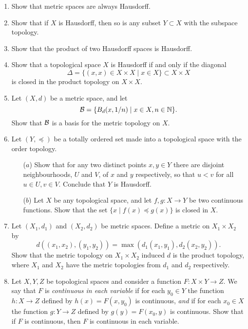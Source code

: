 \begin{enumerate}[label=1.\arabic*]
  \item \label{metric-Hausdorff} Show that metric spaces are always Hausdorff.
  
  \item \label{subspace-Hausdorff} Show that if $X$ is Hausdorff, then so is any subset $Y\subset X$ with the subspace topology.
  
  \item \label{products-Hausdorff} Show that the product of two Hausdorff spaces is Hausdorff.
  
  \item Show that a topological space $X$ is Hausdorff if and only if the diagonal
  \[
    \Delta = \{(x,x) \in X \times X \mid x \in X \} \subset X \times X
  \]
  is closed in the product topology on $X \times X$.
  
  \item \label{metric-first-countable} Let $(X,d)$ be a metric space, and let
  \[
    \mathcal{B} = \{ B_d(x,1/n) \mid x \in X, n \in \mathbb{N} \}.
  \]
  Show that $\mathcal{B}$ is a basis for the metric topology on $X$.
  
  \item Let $(Y,\preceq)$ be a totally ordered set made into a topological space with the order topology.
  \begin{itemize}
    \item[($a$)] Show that for any two distinct points $x, y \in Y$ there are disjoint neighbourhoods, $U$ and $V$, of $x$ and $y$ respectively, so that $u < v$ for all $u \in U, v \in V$. Conclude that $Y$ is Hausdorff.
    \item[($b$)] Let $X$ be any topological space, and let $f,g:X\to Y$ be two continuous functions. Show that the set $\{x \mid f(x)\preceq g(x)\}$ is closed in $X$.
  \end{itemize}
  
  \item Let $(X_1,d_1)$ and $(X_2,d_2)$ be metric spaces. Define a metric on $X_1 \times X_2$ by
	\[
	  d((x_1,x_2),(y_1,y_2)) = \max(d_1(x_1,y_1),d_2(x_2,y_2)).
  \]
  Show that the metric topology on $X_1 \times X_2$ induced $d$ is the product topology, where $X_1$ and $X_2$ have the metric topologies from $d_1$ and $d_2$ respectively.

  
  \item Let $X,Y,Z$ be topological spaces and consider a function $F:X\times Y\rightarrow Z$. We say that $F$ is \emph{continuous in each variable} if for each $y_0\in Y$ the function $h:X\rightarrow Z$ defined by $h(x)=F(x,y_0)$ is continuous, \emph{and} if for each $x_0\in X$ the function $g:Y\rightarrow Z$ defined by $g(y) = F(x_0,y)$ is continuous. Show that if $F$ is continuous, then $F$ is continuous in each variable.
  

\end{enumerate}
